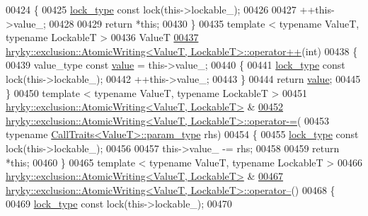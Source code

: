 \begin{DoxyCode}
{{{00424 \{
00425     \hyperlink{classhryky_1_1exclusion_1_1_lock}{lock_type} \textcolor{keyword}{const} lock(this->lockable\_);
00426 
00427     ++this->value\_;
00428 
00429     \textcolor{keywordflow}{return} *\textcolor{keyword}{this};
00430 \}
00435 \textcolor{keyword}{template} < \textcolor{keyword}{typename} ValueT, \textcolor{keyword}{typename} LockableT >
00436 ValueT
\hypertarget{exclusion__atomic_8h_source_l00437}{}\hyperlink{group__exclusion__control_ga6c7259992061b671eb6659fb2ce28f9c}{00437} \hyperlink{classhryky_1_1exclusion_1_1_atomic_writing}{hryky::exclusion::AtomicWriting<ValueT, LockableT>::operator++}(\textcolor{keywordtype}{int})
00438 \{
00439     value\_type \textcolor{keyword}{const} \hyperlink{namespacehryky_1_1log_1_1format_a5b9af9c1a7b018d54144acfb1b8cc960}{value} = this->value\_;
00440     \{
00441         \hyperlink{classhryky_1_1exclusion_1_1_lock}{lock_type} \textcolor{keyword}{const} lock(this->lockable\_);
00442         ++this->value\_;
00443     \}
00444     \textcolor{keywordflow}{return} \hyperlink{namespacehryky_1_1log_1_1format_a5b9af9c1a7b018d54144acfb1b8cc960}{value};
00445 \}
00450 \textcolor{keyword}{template} < \textcolor{keyword}{typename} ValueT, \textcolor{keyword}{typename} LockableT >
00451 \hyperlink{classhryky_1_1exclusion_1_1_atomic_writing}{hryky::exclusion::AtomicWriting<ValueT, LockableT>} & 
\hypertarget{exclusion__atomic_8h_source_l00452}{}\hyperlink{group__exclusion__control_ga64d9930a9aaf9415d206872f01886685}{00452} \hyperlink{classhryky_1_1exclusion_1_1_atomic_writing}{hryky::exclusion::AtomicWriting<ValueT, LockableT>::operator-=}(
00453     \textcolor{keyword}{typename} \hyperlink{classhryky_1_1_call_traits}{CallTraits<ValueT>::param_type} rhs)
00454 \{
00455     \hyperlink{classhryky_1_1exclusion_1_1_lock}{lock_type} \textcolor{keyword}{const} lock(this->lockable\_);
00456 
00457     this->value\_ -= rhs;
00458     
00459     \textcolor{keywordflow}{return} *\textcolor{keyword}{this};
00460 \}
00465 \textcolor{keyword}{template} < \textcolor{keyword}{typename} ValueT, \textcolor{keyword}{typename} LockableT >
00466 \hyperlink{classhryky_1_1exclusion_1_1_atomic_writing}{hryky::exclusion::AtomicWriting<ValueT, LockableT>} & 
\hypertarget{exclusion__atomic_8h_source_l00467}{}\hyperlink{group__exclusion__control_ga2eb1f0dc7165aaf81287e2a05ea05f41}{00467} \hyperlink{classhryky_1_1exclusion_1_1_atomic_writing}{hryky::exclusion::AtomicWriting<ValueT, LockableT>::operator--}()
00468 \{
00469     \hyperlink{classhryky_1_1exclusion_1_1_lock}{lock_type} \textcolor{keyword}{const} lock(this->lockable\_);
00470 
}}}
\end{DoxyCode}
